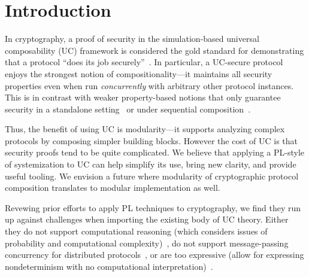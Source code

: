 \section{Introduction}
\label{sec:introduction}

In cryptography, a proof of security in the simulation-based universal composability (UC)
framework is considered the gold standard for demonstrating that a protocol ``does its job
securely''~\cite{canetti2001universally}. In particular, a UC-secure protocol
enjoys the strongest notion of compositionality---it maintains all security
properties even when run \emph{concurrently} with arbitrary other protocol instances.
This is in contrast with weaker property-based notions that only guarantee security in a standalone
setting~\cite{lindell2014introduction} or under sequential
composition~\cite{goldreich1987play}.
%
\begin{comment}
In a nutshell, security proofs in UC follow the real/ideal
paradigm~\cite{goldreich1987play}. The security requirements of a given task are
defined as a program for a \emph{single trusted process} called an \emph{ideal
  functionality}, which runs in an imagined ideal world. This serves as a
specification of the desired security properties for a distributed protocol
achieving the task across \emph{many unstrusted processes}, which runs in the
real world. Roughly speaking, we say that a protocol $\pi$ \emph{emulates} an
ideal functionality $\mc{F}$ (i.e., it meets its specification) if every
adversarial behavior in the real world can also be exhibited in the ideal world.
\end{comment}
%
Thus, the benefit of using UC is
modularity---it supports analyzing complex protocols by composing simpler
building blocks.
However the cost of UC is that security proofs tend to be quite
complicated.
We believe that applying a PL-style of systemization to UC can help
simplify its use, bring new clarity, and provide useful tooling.
We envision a future where modularity of cryptographic protocol composition
translates to modular implementation as well.

Revewing prior efforts to apply PL techniques to cryptography,
we find they run up against challenges when importing the existing
body of UC theory.
Either they do not support
computational reasoning (which considers issues of probability and computational
complexity)~\cite{bohl2016symbolic}, do not support message-passing concurrency for distributed protocols~\cite{barthe2011computer},
or are too expressive (allow for expressing nondeterminism with no computational interpretation)~\cite{abadi1999calculus}.

